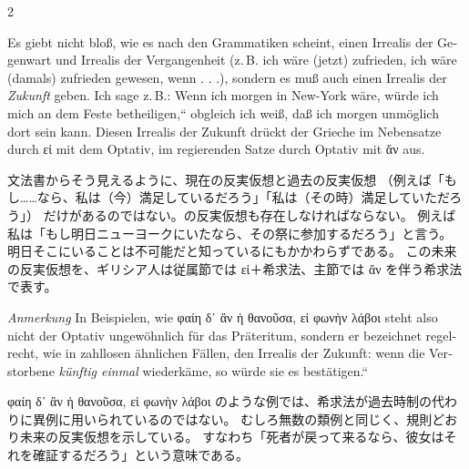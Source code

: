 \begin{paracol}{2}
\begin{enumerate}[leftmargin=0pt,rightmargin=0pt,listparindent =1cm,labelindent=1cm,labelsep=1ex,labelwidth={*},itemindent={*},align=left]
\begin{german}
\item Es giebt nicht bloß, wie es nach den Grammatiken scheint, einen Irrealis
der Gegenwart und Irrealis der Vergangenheit (z.\,B. ich wäre (jetzt)
zufrieden, ich wäre (damals) zufrieden gewesen, wenn . . .), sondern
es muß auch einen Irrealis der \emph{Zukunft} geben. Ich sage z.\,B.:
\quotedblbase Wenn ich morgen in New-York wäre, würde ich mich an
dem Feste betheiligen,`` obgleich ich weiß, daß ich morgen unmöglich
dort sein kann. Diesen Irrealis der Zukunft drückt der Grieche im
Nebensatze durch \textgreek[variant=ancient]{εἰ} mit dem Optativ,
im regierenden Satze durch Optativ mit \textgreek[variant=ancient]{ἄν}
aus. 
\end{german}
\switchcolumn

\begin{japanese}
文法書からそう見えるように、現在の反実仮想と過去の反実仮想
（例えば「もし……なら、私は（今）満足しているだろう」「私は（その時）満足していただろう」）
だけがあるのではない。の反実仮想も存在しなければならない。
例えば私は「もし明日ニューヨークにいたなら、その祭に参加するだろう」と言う。
明日そこにいることは不可能だと知っているにもかかわらずである。
この未来の反実仮想を、ギリシア人は従属節では
\textgreek[variant=ancient]{εἰ}＋希求法、主節では \textgreek[variant=ancient]{ἄν} を伴う希求法で表す。
\end{japanese}
\switchcolumn*
\end{enumerate}

\begin{german}
\emph{Anmerkung} In Beispielen, wie \textgreek[variant=ancient]{φαίη
δ᾽ ἂν ἡ θανοῦσα, εἰ φωνὴν λάβοι} steht also nicht der Optativ ungewöhnlich
für das Präteritum, sondern er bezeichnet regelrecht, wie in zahllosen
ähnlichen Fällen, den Irrealis der Zukunft: \quotedblbase wenn die
Verstorbene \emph{künftig einmal} wiederkäme, so würde sie es bestätigen.`` 
\end{german}
\switchcolumn

\begin{japanese}
 \textgreek[variant=ancient]{φαίη δ᾽ ἂν ἡ θανοῦσα, εἰ φωνὴν λάβοι}
のような例では、希求法が過去時制の代わりに異例に用いられているのではない。
むしろ無数の類例と同じく、規則どおり未来の反実仮想を示している。
すなわち「死者が戻って来るなら、彼女はそれを確証するだろう」という意味である。
\end{japanese}
\switchcolumn*

\end{paracol}
